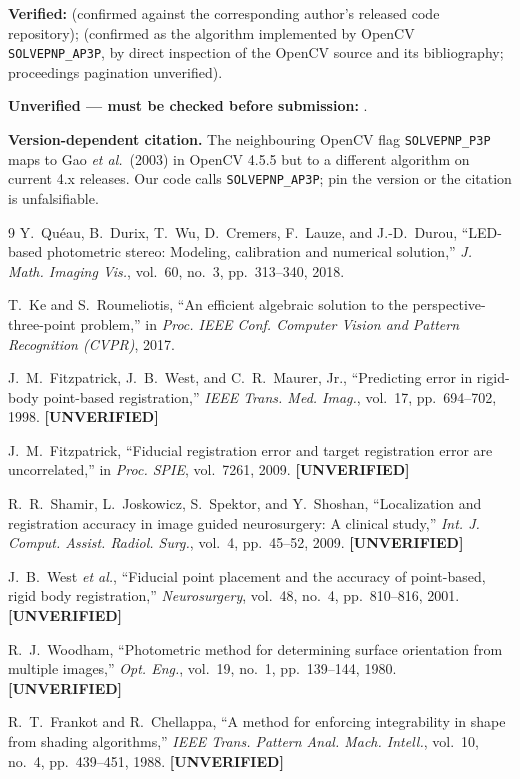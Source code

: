 \documentclass[journal,10pt]{IEEEtran}
\newcommand{\TODO}[1]{\textcolor{todoRed}{\textbf{[#1]}}}
\begin{document}
\textbf{Verified:} \cite{queau2018led} (confirmed against the corresponding
author's released code repository); \cite{ke2017} (confirmed as the algorithm
implemented by OpenCV \texttt{SOLVEPNP\_AP3P}, by direct inspection of the OpenCV
source and its bibliography; proceedings pagination unverified).

\textbf{Unverified --- must be checked before submission:}
\cite{fitzpatrick1998,fitzpatrick2009,shamir2009,west2001,woodham1980,frankot1988}.

\textbf{Version-dependent citation.} The neighbouring OpenCV flag
\texttt{SOLVEPNP\_P3P} maps to Gao \textit{et al.}~(2003) in OpenCV 4.5.5 but to
a different algorithm on current 4.x releases. Our code calls
\texttt{SOLVEPNP\_AP3P}; pin the version or the citation is unfalsifiable.

\begin{thebibliography}{9}
\footnotesize
{}
Y.~Qu\'eau, B.~Durix, T.~Wu, D.~Cremers, F.~Lauze, and J.-D.~Durou,
``LED-based photometric stereo: Modeling, calibration and numerical solution,''
\emph{J. Math. Imaging Vis.}, vol.~60, no.~3, pp.~313--340, 2018.

T.~Ke and S.~Roumeliotis, ``An efficient algebraic solution to the
perspective-three-point problem,'' in \emph{Proc. IEEE Conf. Computer Vision and
Pattern Recognition (CVPR)}, 2017.

J.~M.~Fitzpatrick, J.~B.~West, and C.~R.~Maurer, Jr., ``Predicting error in
rigid-body point-based registration,'' \emph{IEEE Trans. Med. Imag.}, vol.~17,
pp.~694--702, 1998. \TODO{UNVERIFIED}

J.~M.~Fitzpatrick, ``Fiducial registration error and target registration error
are uncorrelated,'' in \emph{Proc. SPIE}, vol.~7261, 2009. \TODO{UNVERIFIED}

R.~R.~Shamir, L.~Joskowicz, S.~Spektor, and Y.~Shoshan, ``Localization and
registration accuracy in image guided neurosurgery: A clinical study,''
\emph{Int. J. Comput. Assist. Radiol. Surg.}, vol.~4, pp.~45--52, 2009.
\TODO{UNVERIFIED}

J.~B.~West \emph{et al.}, ``Fiducial point placement and the accuracy of
point-based, rigid body registration,'' \emph{Neurosurgery}, vol.~48, no.~4,
pp.~810--816, 2001. \TODO{UNVERIFIED}

R.~J.~Woodham, ``Photometric method for determining surface orientation from
multiple images,'' \emph{Opt. Eng.}, vol.~19, no.~1, pp.~139--144, 1980.
\TODO{UNVERIFIED}

R.~T.~Frankot and R.~Chellappa, ``A method for enforcing integrability in shape
from shading algorithms,'' \emph{IEEE Trans. Pattern Anal. Mach. Intell.},
vol.~10, no.~4, pp.~439--451, 1988. \TODO{UNVERIFIED}
\end{thebibliography}
\end{document}
